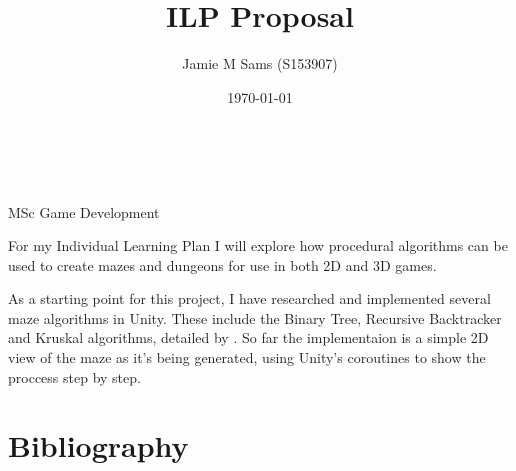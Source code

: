 \documentclass[a4paper, 12pt]{article}
\title{ILP Proposal}
\author{Jamie M Sams (S153907)}
\date{\today}
\begin{document}

\begin{titlepage}
	\vspace*{\fill}
	\centering
	{\huge \thetitle}\\[.5cm]
	{\large \theauthor}\\[.5cm]
	{MSc Game Development}
	\vspace*{\fill}
\end{titlepage}

\lhead{\theauthor}

For my Individual Learning Plan I will explore how procedural algorithms can be used to create mazes and dungeons for use in both 2D and 3D games.

As a starting point for this project, I have researched and implemented several maze algorithms in Unity.  These include the Binary Tree, Recursive Backtracker and Kruskal algorithms, detailed by \cite{Buck2015}.  So far the implementaion is a simple 2D view of the maze as it's being generated, using Unity's coroutines to show the proccess step by step.



\pagebreak
\section*{Bibliography}

\printbibliography[heading=none]
\end{document}

